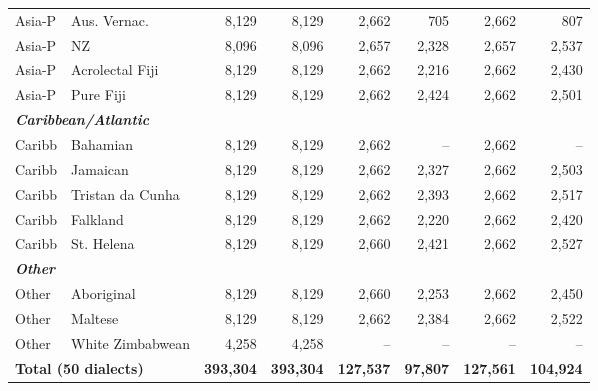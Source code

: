 \begin{table}[t]
\begin{tabular}{llrrrrrr}
Asia-P & Aus. Vernac. & 8,129 & 8,129 & 2,662 & 705 & 2,662 & 807 \\
Asia-P & NZ & 8,096 & 8,096 & 2,657 & 2,328 & 2,657 & 2,537 \\
Asia-P & Acrolectal Fiji & 8,129 & 8,129 & 2,662 & 2,216 & 2,662 & 2,430 \\
Asia-P & Pure Fiji & 8,129 & 8,129 & 2,662 & 2,424 & 2,662 & 2,501 \\
\midrule
\multicolumn{8}{l}{\textit{\textbf{Caribbean/Atlantic}}} \\
Caribb & Bahamian & 8,129 & 8,129 & 2,662 & -- & 2,662 & -- \\
Caribb & Jamaican & 8,129 & 8,129 & 2,662 & 2,327 & 2,662 & 2,503 \\
Caribb & Tristan da Cunha & 8,129 & 8,129 & 2,662 & 2,393 & 2,662 & 2,517 \\
Caribb & Falkland & 8,129 & 8,129 & 2,662 & 2,220 & 2,662 & 2,420 \\
Caribb & St. Helena & 8,129 & 8,129 & 2,660 & 2,421 & 2,662 & 2,527 \\
\midrule
\multicolumn{8}{l}{\textit{\textbf{Other}}} \\
Other & Aboriginal & 8,129 & 8,129 & 2,660 & 2,253 & 2,662 & 2,450 \\
Other & Maltese & 8,129 & 8,129 & 2,662 & 2,384 & 2,662 & 2,522 \\
Other & White Zimbabwean & 4,258 & 4,258 & -- & -- & -- & -- \\
\midrule
\multicolumn{2}{l}{\textbf{Total (50 dialects)}} & \textbf{393,304} & \textbf{393,304} & \textbf{127,537} & \textbf{97,807} & \textbf{127,561} & \textbf{104,924} \\
\bottomrule
\end{tabular}
\end{table}